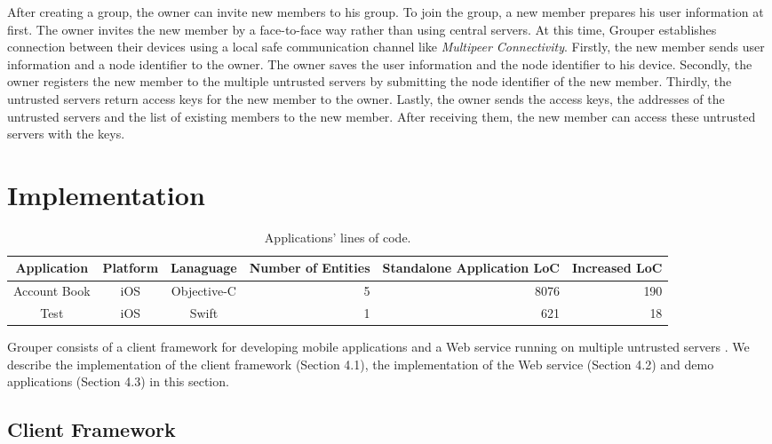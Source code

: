 After creating a group, the owner can invite new members to his group. 
To join the group, a new member prepares his user information at first. 
The owner invites the new member by a face-to-face way rather than using central servers. 
At this time, Grouper establishes connection between their devices using a local safe communication channel like \emph{Multipeer Connectivity}\cite{mc}. 
Firstly, the new member sends user information and a node identifier to the owner. 
The owner saves the user information and the node identifier to his device. 
Secondly, the owner registers the new member to the multiple untrusted servers by submitting the node identifier of the new member. 
Thirdly, the untrusted servers return access keys for the new member to the owner. 
Lastly, the owner sends the access keys, the addresses of the untrusted servers and the list of existing members to the new member. 
After receiving them, the new member can access these untrusted servers with the keys.

\section{Implementation}

\begin{table*}[t]
	\small
	\centering
	\caption{Applications' lines of code.}
	\label{my-label}
	\begin{tabular}{cccccc}
		\hline
		\textbf{Application} & \textbf{Platform} & \textbf{Lanaguage} & \textbf{Number of Entities} & \textbf{Standalone Application LoC} & \textbf{Increased LoC} \\ \hline
		Account Book & iOS & Objective-C & \multicolumn{1}{r}{5} & \multicolumn{1}{r}{8076} & \multicolumn{1}{r}{190} \\ 
		Test & iOS & Swift & \multicolumn{1}{r}{1} & \multicolumn{1}{r}{621} & \multicolumn{1}{r}{18} \\  \hline 
	\end{tabular}
\end{table*}

Grouper consists of a client framework for developing mobile applications and a Web service running on multiple untrusted servers .
We describe the implementation of the client framework (Section 4.1), the implementation of the Web service (Section 4.2) and demo applications (Section 4.3) in this section.

\subsection{Client Framework}

